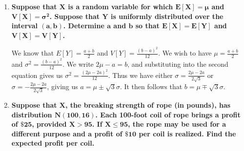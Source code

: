 \documentclass[10pt, oneside]{article}
\begin{document}
\begin{enumerate}[label=9.\arabic*]
\begin{enumerate}
	\item  \begin{tcolorbox}[
	  colback=Cerulean!5!white,
	  colframe=Cerulean!75!black]
	\textbf{$\bm{X}$ has exponential distribution with parameter $\bm{\alpha}$.}
	\end{tcolorbox}
	
	We know $E[X] = 1/ \alpha$ and $V[X] = 1 / \alpha^2$. It is immediately apparent that $P(X \leq \mu - 2\sigma) = P(X \leq -1/\alpha) = 0$, since the exponential distribution exists only for $X \geq 0$. Therefore we need only calculate $P(X \geq \mu + 2\sigma)$:
	
	\[ 1 - \int^{3/\alpha}_0 \alpha e^{-\alpha x} \ dx = \boxed{e^{-3}} \approx 0.0498 \leq \frac{1}{2^2} = 0.25 \]
	
	\end{enumerate}

\item  \begin{tcolorbox}[
  colback=Cerulean!5!white,
  colframe=Cerulean!75!black]
\textbf{Suppose that $\bm{X}$ is a random variable for which $\bm{E[X] = \mu}$ and $\bm{V[X] = \sigma^2}$. Suppose that $\bm{Y}$ is uniformly distributed over the interval $\bm{(a,b)}$. Determine $\bm{a}$ and $\bm{b}$ so that $\bm{E[X] = E[Y]}$ and $\bm{V[X] = V[Y]}$.}
\end{tcolorbox}

We know that $E[Y] = \frac{a+b}{2}$ and $V[Y] = \frac{(b-a)^2}{12}$. We wish to have $\mu = \frac{a+b}{2}$ and $\sigma^2 = \frac{(b-a)^2}{12}$. We write $2\mu - a = b$, and substituting into the second equation gives us $\sigma^2 = \frac{(2\mu - 2a)^2}{12}$. Thus we have either $\sigma = \frac{2\mu - 2a}{2 \sqrt{3}}$ or $\sigma = -\frac{2\mu - 2a}{2 \sqrt{3}}$, giving us $\boxed{a = \mu \pm \sqrt{3} \sigma}$. It then follows that $\boxed{b = \mu \mp \sqrt{3} \sigma}$.

\newpage
\item  \begin{tcolorbox}[
  colback=Cerulean!5!white,
  colframe=Cerulean!75!black]
\textbf{Suppose that $\bm{X}$, the breaking strength of rope (in pounds), has distribution $\bm{N(100,16)}$. Each 100-foot coil of rope brings a profit of $\bm{\$ 25}$, provided $\bm{X > 95}$. If $\bm{X \leq 95}$, the rope may be used for a different purpose and a profit of $\bm{\$ 10}$ per coil is realized. Find the expected profit per coil.}
\end{tcolorbox}


\end{enumerate}
\end{document}
